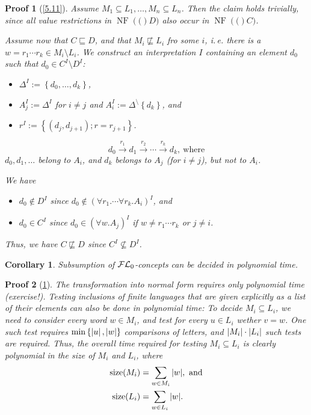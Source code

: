 \documentclass[openany]{scrbook}
\theoremstyle{break}
\newtheorem{Corollary}[Theorem]{Corollary}
\theoremstyle{nonumberbreak}
\theoremstyle{nonumberplain}
\theoremstyle{nonumberbreak}
\newtheorem{Proof}{Proof}
\newcommand{\then}{\Longrightarrow}
\newcommand{\abs}[2][]{\left|{#2}\right|\ifx#1\then\else_{#1}\fi}
\newcommand{\set}[1]{\left\{#1\right\}}
\newcommand{\ie}{i{.}\,e{.}\xspace}
\newcommand{\FLz}{{\cal F}{\cal L}_0}
\newcommand{\NF}[1]{\operatorname{NF}\left(#1\right)}
\newcommand{\size}{\operatorname{size}}
\begin{document}
\begin{Proof}[\cref{5.11}]
  Assume $M_1 \subseteq L_1, \dotsc, M_n \subseteq L_n$. Then the
  claim holds trivially, since all value restrictions in $\NF(D)$
  also occur in $\NF(C)$.

  Assume now that $C \sqsubseteq D$, and that $M_i \not\sqsubseteq
  L_i$ fro some $i$, \ie there is a $w = r_1 \dotsm r_k \in M_i
  \setminus L_i$. We construct an interpretation $I$ containing an
  element $d_0$ such that $d_0 \in C^I \setminus D^I$:
  \begin{itemize}
  \item $\Delta^I := \set{d_0, \dotsc, d_k}$,
  \item $A_j^I := \Delta^I$ for $i \ne j$ and $A_i^I := \Delta^
    \setminus \set{d_k}$, and
  \item $r^I := \set{(d_j, d_{j + 1}); r = r_{j + 1}}$.
  \end{itemize}
  \begin{equation*}
    d_0 \xrightarrow{r_1} d_1 \xrightarrow{r_2} \dotsb
    \xrightarrow{r_k} d_k,\ \text{where}
  \end{equation*}
  $d_0, d_1, \dotsc$ belong to $A_i$, and $d_k$ belongs to $A_j$ (for
  $i \ne j$), but not to $A_i$.

  We have
  \begin{itemize}
  \item $d_0 \not\in D^I$ since $d_0 \not\in\left(\forall r_1. \dotsb
      \forall r_k. A_i\right)^I$, and
  \item $d_0 \in C^I$ since $d_0 \in (\forall w. A_j)^I$ if $w
    \ne r_1 \dotsm r_k$ or $j \ne i$.
  \end{itemize}

  Thus, we have $C \not\sqsubseteq D$ since $C^I \not\subseteq D^I$.
\end{Proof}

\begin{Corollary}
  \label{5.12}
  Subsumption of $\FLz$-concepts can be decided in polynomial time.
\end{Corollary}

\begin{Proof}[\cref{5.12}]
  The transformation into normal form requires only polynomial time
  (exercise!). Testing inclusions of finite languages that are given
  explicitly as a list of their elements can also be done in
  polynomial time: To decide $M_i \subseteq L_i$, we need to consider
  every word $w \in M_i$, and test for every $u \in L_i$ wether $v =
  w$. One such test requires $\min\set{\abs{u}, \abs{w}}$ comparisons
  of letters, and $\abs{M_i} \cdot \abs{L_i}$ such tests are
  required. Thus, the overall time required for testing $M_i \subseteq
  L_i$ is clearly polynomial in the size of $M_i$ and $L_i$, where
  \begin{align*}
    \size(M_i) & = \sum_{w \in M_i}{\abs{w}},\ \text{and} \\
    \size(L_i) & = \sum_{w \in L_i}{\abs{w}}.
  \end{align*}
\end{Proof}
\end{document}
